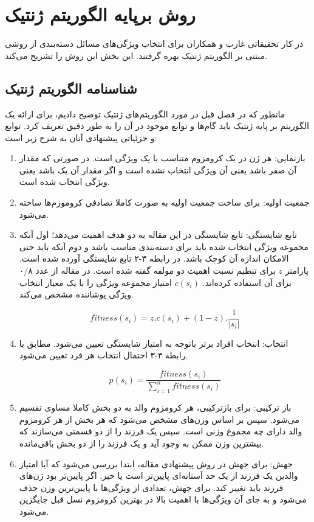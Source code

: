\section{روش برپایه الگوریتم ژنتیک}
در کار تحقیقاتی غارب و همکاران برای انتخاب ویژگی‌های مسائل دسته‌بندی از روشی مبتنی بر الگوریتم ژنتیک بهره گرفتند.\cite{ghareb2016hybrid} این بخش این روش را تشریح می‌کند.
\subsection{شناسنامه الگوریتم ژنتیک}
مانطور که در فصل قبل در مورد الگوریتم‌های ژنتیک توضیح دادیم، برای ارائه یک الگوریتم بر پایه ژنتیک باید گام‌ها و توابع موجود در آن را به طور دقیق تعریف کرد. توابع و جزئیاتی پیشنهادی آنان به شرح زیر است:
\begin{enumerate}
\item بازنمایی: هر ژن در یک کرومزوم متناسب با یک ويژگی است. در صورتی که مقدار آن صفر باشد یعنی آن ویژگی انتخاب نشده است و اگر مقدار آن یک باشد یعنی ویژگی انتخاب شده است.
\item جمعیت اولیه: برای ساخت جمعیت اولیه به صورت کاملا تصادفی کروموزم‌ها ساخته می‌شود.
\item تابع شایستگی: تابع شایستگی در این مقاله به دو هدف اهمیت می‌دهد؛ اول آنکه مجموعه ویژگی انتخاب شده باید برای دسته‌بندی مناسب باشد و دوم آنکه باید حتی الامکان اندازه آن کوچک باشد. در رابطه ۳-۲ تابع شایستگی آورده شده است. پارامتر
$z$
برای تنظیم نسبت اهمیت دو مولفه گفته شده است. در مقاله از عدد ۰/۸ برای آن استفاده کرده‌اند.
$c(s_i)$
امتیاز مجموعه ویژگی را با یک معیار انتخاب ویژگی پوشاننده مشخص می‌کند.

\begin{equation}
fitness(s_i) = z.c(s_i) + (1-z).\frac{1}{|s_i|}
\end{equation}

\item انتخاب: انتخاب افراد برتر باتوجه به امتیاز شایستگی تعیین می‌شود. مطابق با رابطه ۳-۳ احتمال انتخاب هر فرد تعیین می‌شود.

\begin{equation}
p(s_i) = \frac{fitness(s_i)}{\sum_{i=1}^n fitness(s_i)}
\end{equation}

\item باز ترکیبی: برای بازترکیبی، هر کرومزوم والد به دو بخش کاملا مساوی تقسیم می‌شود. سپس بر اساس وزن‌های  مشخص می‌شود که هر بخش از هر کرومزوم والد دارای چه مجموع وزنی است. سپس یک فرزند را از دو قسمتی می‌سازند که بیشترین وزن ممکن به وجود آید و یک فرزند را از دو بخش باقی‌مانده.
\item جهش: برای جهش در روش پیشنهادی مقاله، ابتدا بررسی می‌شود که آیا امتیاز والدین یک فرزند از یک حد آستانه‌ای پایین‌تر است یا خیر. اگر پایین‌تر بود ژن‌های فرزند باید تغییر کند. برای جهش، تعدادی از ویژگی‌ها با پایین‌ترین وزن حذف می‌شود و به جای آن ویژگی‌ها با اهمیت بالا در بهترین کرومزوم نسل قبل جایگزین می‌شود.
\end{enumerate}

